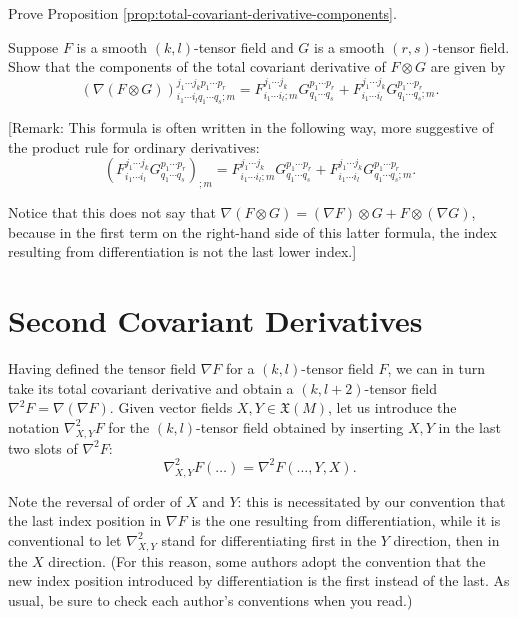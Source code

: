 \begin{exercise}
\label{exer:prove-proposition-4-18}
Prove Proposition \ref{prop:total-covariant-derivative-components}.
\end{exercise}

\begin{exercise}
\label{exer:tensor-product-covariant-derivative}
Suppose $F$ is a smooth $(k,l)$-tensor field and $G$ is a smooth $(r,s)$-tensor field. Show that the components of the total covariant derivative of $F \otimes G$ are given by
\[
(\nabla(F \otimes G))^{j_1\cdots j_k p_1\cdots p_r}_{i_1\cdots i_l q_1\cdots q_s;m} = F^{j_1\cdots j_k}_{i_1\cdots i_l;m} G^{p_1\cdots p_r}_{q_1\cdots q_s} + F^{j_1\cdots j_k}_{i_1\cdots i_l} G^{p_1\cdots p_r}_{q_1\cdots q_s;m}.
\]

[Remark: This formula is often written in the following way, more suggestive of the product rule for ordinary derivatives:
\[
\left(F^{j_1\cdots j_k}_{i_1\cdots i_l} G^{p_1\cdots p_r}_{q_1\cdots q_s}\right)_{;m} = F^{j_1\cdots j_k}_{i_1\cdots i_l;m} G^{p_1\cdots p_r}_{q_1\cdots q_s} + F^{j_1\cdots j_k}_{i_1\cdots i_l} G^{p_1\cdots p_r}_{q_1\cdots q_s;m}.
\]

Notice that this does not say that $\nabla(F \otimes G) = (\nabla F) \otimes G + F \otimes (\nabla G)$, because in the first term on the right-hand side of this latter formula, the index resulting from differentiation is not the last lower index.]
\end{exercise}

\section{Second Covariant Derivatives}

Having defined the tensor field $\nabla F$ for a $(k,l)$-tensor field $F$, we can in turn take its total covariant derivative and obtain a $(k, l + 2)$-tensor field $\nabla^2 F = \nabla(\nabla F)$. Given vector fields $X, Y \in \mathfrak{X}(M)$, let us introduce the notation $\nabla^2_{X,Y} F$ for the $(k,l)$-tensor field obtained by inserting $X, Y$ in the last two slots of $\nabla^2 F$:
\[
\nabla^2_{X,Y} F(\ldots) = \nabla^2 F(\ldots, Y, X).
\]

Note the reversal of order of $X$ and $Y$: this is necessitated by our convention that the last index position in $\nabla F$ is the one resulting from differentiation, while it is conventional to let $\nabla^2_{X,Y}$ stand for differentiating first in the $Y$ direction, then in the $X$ direction. (For this reason, some authors adopt the convention that the new index position introduced by differentiation is the first instead of the last. As usual, be sure to check each author's conventions when you read.)


